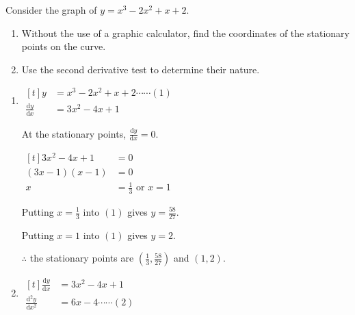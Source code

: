 \documentclass[11pt,a4paper]{book}
\begin{document}
\begin{example}

Consider the graph of $y=x^{3}-2x^{2}+x+2$.

\begin{enumerate}[label=(\alph*)]

\item  Without the use of a graphic calculator, find the coordinates
of the stationary points on the curve.

\item  Use the second derivative test to determine their nature.

\end{enumerate}

\Solution

\begin{enumerate}[label=(\alph*)]

\item
\begin{minipage}[t]{0.4\textwidth}
$
\begin{aligned}[t]
y & =x^{3}-2x^{2}+x+2\cdots\cdots(1)\\
\frac{\mathrm{d}y}{\mathrm{d}x} & =3x^{2}-4x+1
\end{aligned}
$

At the stationary points, ${\displaystyle \frac{\mathrm{d}y}{\mathrm{d}x}=0}$.

$
\begin{aligned}[t]
3x^{2}-4x+1 & =0\\
\left(3x-1\right)\left(x-1\right) & =0\\
x & =\frac{1}{3}\text{ or }x=1
\end{aligned}
$

\end{minipage}
\vline\hfill
\begin{minipage}[t]{0.5\textwidth}

Putting ${\displaystyle x=\frac{1}{3}}$ into $\left(1\right)$ gives
${\displaystyle y=\frac{58}{27}}$.

\bigskip

Putting ${\displaystyle x=1}$ into $\left(1\right)$ gives $y=2$.

\bigskip

$\therefore$ the stationary points are ${\displaystyle \left(\frac{1}{3},\frac{58}{27}\right)}$ and $\left(1,2\right)$.

\end{minipage}
\item

$
\begin{aligned}[t]
\frac{\mathrm{d}y}{\mathrm{d}x} & =3x^{2}-4x+1\\
\frac{{\mathrm{d}}^{2}y}{{\mathrm{d}}x^{2}} & =6x-4\cdots\cdots(2)
\end{aligned}
$


\end{enumerate}
\end{example}
\end{document}
